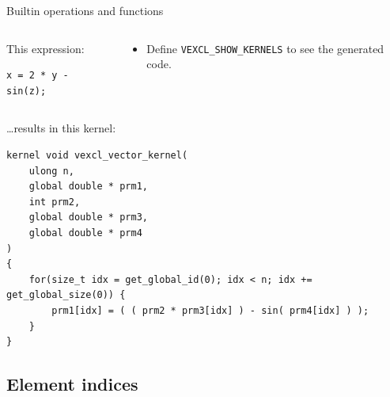 \documentclass[@BEAMER_OPTIONS@]{beamer}
\newcommand{\code}[1]{\lstinline|#1|}
\begin{document}

\begin{frame}[fragile]{Builtin operations and functions}
    \begin{columns}
        \begin{column}{0.38\textwidth}
            \begin{exampleblock}{This expression:}
                \begin{lstlisting}
x = 2 * y - sin(z);
                \end{lstlisting}
            \end{exampleblock}
        \end{column}
        \begin{column}{0.55\textwidth}
            \begin{itemize}
                \item Define \code{VEXCL_SHOW_KERNELS} to see the generated code.
            \end{itemize}
        \end{column}
    \end{columns}
    \begin{exampleblock}{\ldots results in this kernel:}
        \begin{lstlisting}
kernel void vexcl_vector_kernel(
    ulong n,
    global double * prm1,
    int prm2,
    global double * prm3,
    global double * prm4
)
{
    for(size_t idx = get_global_id(0); idx < n; idx += get_global_size(0)) {
        prm1[idx] = ( ( prm2 * prm3[idx] ) - sin( prm4[idx] ) );
    }
}
        \end{lstlisting}
    \end{exampleblock}
\end{frame}

\subsection{Element indices}
\end{document}
